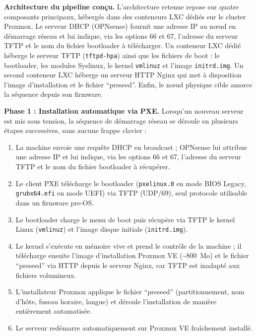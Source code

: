 \par \textbf{Architecture du pipeline conçu.} L'architecture retenue repose sur quatre composants principaux, hébergés dans des conteneurs LXC dédiés sur le cluster Proxmox. Le serveur DHCP (OPNsense) fournit une adresse IP au nœud en démarrage réseau et lui indique, via les options 66 et 67, l'adresse du serveur TFTP et le nom du fichier bootloader à télécharger. Un conteneur LXC dédié héberge le serveur TFTP (\texttt{tftpd-hpa}) ainsi que les fichiers de boot : le bootloader, les modules Syslinux, le kernel \texttt{vmlinuz} et l'image \texttt{initrd.img}. Un second conteneur LXC héberge un serveur HTTP Nginx qui met à disposition l'image d'installation et le fichier ``preseed''. Enfin, le nœud physique cible amorce la séquence depuis son firmware.\\

\par \textbf{Phase 1 : Installation automatique via PXE.} Lorsqu'un nouveau serveur est mis sous tension, la séquence de démarrage réseau se déroule en plusieurs étapes successives, sans aucune frappe clavier :\\

\begin{enumerate}
    \item La machine envoie une requête DHCP en broadcast ; OPNsense lui attribue une adresse IP et lui indique, via les options 66 et 67, l'adresse du serveur TFTP et le nom du fichier bootloader à récupérer.
    \item Le client PXE télécharge le bootloader (\texttt{pxelinux.0} en mode BIOS Legacy, \texttt{grubx64.efi} en mode UEFI) via TFTP (UDP/69), seul protocole utilisable dans un firmware pre-OS.
    \item Le bootloader charge le menu de boot puis récupère via TFTP le kernel Linux (\texttt{vmlinuz}) et l'image disque initiale (\texttt{initrd.img}).
    \item Le kernel s'exécute en mémoire vive et prend le contrôle de la machine ; il télécharge ensuite l'image d'installation Proxmox VE (\textasciitilde{}800~Mo) et le fichier ``preseed'' via HTTP depuis le serveur Nginx, car TFTP est inadapté aux fichiers volumineux.
    \item L'installateur Proxmox applique le fichier ``preseed'' (partitionnement, nom d'hôte, fuseau horaire, langue) et déroule l'installation de manière entièrement automatisée.
    \item Le serveur redémarre automatiquement sur Proxmox VE fraîchement installé.
\end{enumerate}

